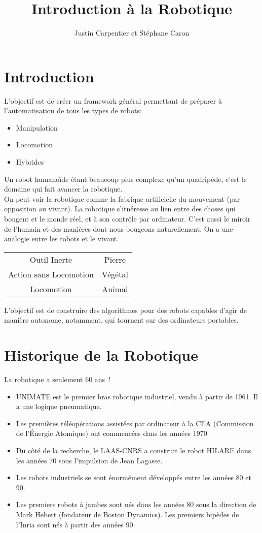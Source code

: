 \documentclass[math]{cours}
\title{Introduction à la Robotique}
\author{Justin Carpentier et Stéphane Caron}
\begin{document}
\bettertitle
\section*{Introduction}
L'objectif est de créer un framework général permettant de préparer à l'automatisation de tous les types de robots:
\begin{itemize}
	\item Manipulation
	\item Locomotion
	\item Hybrides
\end{itemize}
Un robot humanoïde étant beaucoup plus complexe qu'un quadripède, c'est le domaine qui fait avancer la robotique.\\

On peut voir la robotique comme la fabrique artificielle du mouvement (par opposition au vivant).
La robotique s'itnéresse au lien entre des choses qui bougent et le monde réel, et à son contrôle par ordinateur.
C'est aussi le miroir de l'humain et des manières dont nous bougeons naturellement.
On a une analogie entre les robots et le vivant.
\begin{center}\begin{tabular}{cc}
		Outil Inerte & Pierre\\
		Action sans Locomotion & Végétal\\
		Locomotion & Animal
\end{tabular}\end{center}
L'objectif est de construire des algorithmes pour des robots capables d'agir de manière autonome, notamment, qui tournent sur des ordinateurs portables.

\section*{Historique de la Robotique}
La robotique a seulement 60 ans~!
\begin{itemize}
	\item UNIMATE est le premier bras robotique industriel, vendu à partir de 1961.
		Il a une logique pneumatique.
	\item Les premières téléopérations assistées par ordinateur à la CEA (Commission de l'Énergie Atomique) ont commencées dans les années 1970
	\item Du côté de la recherche, le LAAS-CNRS a construit le robot HILARE dans les années 70 sous l'impulsion de Jean Lagasse.
	\item Les robots industriels se sont énormément développés entre les années 80 et 90.
	\item Les premiers robots à jambes sont nés dans les années 80 sous la direction de Mark Hebert (fondateur de Boston Dynamics).
		Les premiers bipèdes de l'Inria sont nés à partir des années 90.
\end{itemize}
\end{document}
